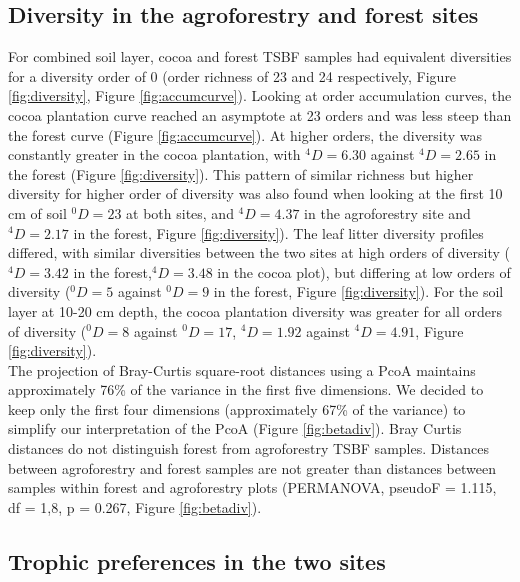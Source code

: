 \documentclass[fleqn,10pt]{ArtEcoFoG} %
\begin{document}
\subsection{Diversity in the agroforestry and forest sites}\label{diversity-in-the-agroforestry-and-forest-sites}

For combined soil layer, cocoa and forest TSBF samples had equivalent diversities for a diversity order of 0 (order richness of 23 and 24 respectively, Figure \ref{fig:diversity}, Figure \ref{fig:accumcurve}). Looking at order accumulation curves, the cocoa plantation curve reached an asymptote at 23 orders and was less steep than the forest curve (Figure \ref{fig:accumcurve}). At higher orders, the diversity was constantly greater in the cocoa plantation, with \(^4D = 6.30\) against \(^4D = 2.65\) in the forest (Figure \ref{fig:diversity}). This pattern of similar richness but higher diversity for higher order of diversity was also found when looking at the first 10 cm of soil \(^0D = 23\) at both sites, and \(^4D = 4.37\) in the agroforestry site and \(^4D = 2.17\) in the forest, Figure \ref{fig:diversity}). The leaf litter diversity profiles differed, with similar diversities between the two sites at high orders of diversity (\(^4D = 3.42\) in the forest,\(^4D = 3.48\) in the cocoa plot), but differing at low orders of diversity (\(^0D = 5\) against \(^0D = 9\) in the forest, Figure \ref{fig:diversity}). For the soil layer at 10-20 cm depth, the cocoa plantation diversity was greater for all orders of diversity (\(^0D = 8\) against \(^0D = 17\), \(^4D = 1.92\) against \(^4D = 4.91\), Figure \ref{fig:diversity}).\\
The projection of Bray-Curtis square-root distances using a PcoA maintains approximately 76\% of the variance in the first five dimensions. We decided to keep only the first four dimensions (approximately 67\% of the variance) to simplify our interpretation of the PcoA (Figure \ref{fig:betadiv}). Bray Curtis distances do not distinguish forest from agroforestry TSBF samples. Distances between agroforestry and forest samples are not greater than distances between samples within forest and agroforestry plots (PERMANOVA, pseudoF = 1.115, df = 1,8, p = 0.267, Figure \ref{fig:betadiv}).

\subsection{Trophic preferences in the two sites}\label{trophic-preferences-in-the-two-sites}
\end{document}
